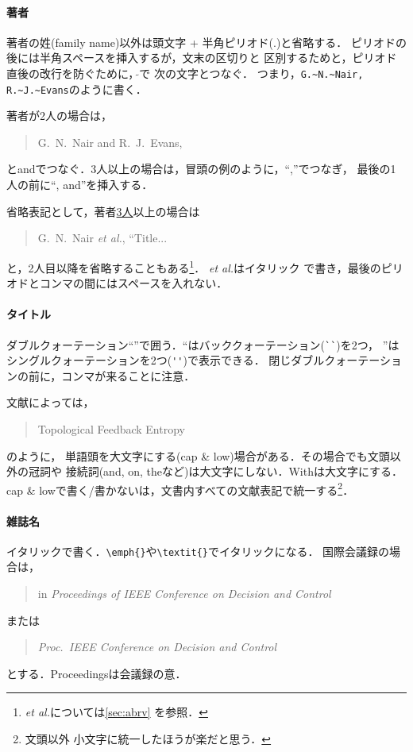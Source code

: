 \documentclass[a4paper,10pt,twocolumn,dvipdfmx]{jsarticle}
\theoremstyle{definition}
\begin{document}
\paragraph{著者}
著者の姓(family name)以外は頭文字 + 半角ピリオド(.)と省略する．
ピリオドの後には半角スペースを挿入するが，文末の区切りと
区別するためと，ピリオド直後の改行を防ぐために，$\tilde{}$で
次の文字とつなぐ．
つまり，\verb|G.~N.~Nair, R.~J.~Evans|のように書く．

著者が2人の場合は，
\begin{quote}
 G.~N.~Nair and R.~J.~Evans,
\end{quote}
とandでつなぐ．3人以上の場合は，冒頭の例のように，``,''でつなぎ，
最後の1人の前に``, and''を挿入する．

省略表記として，著者\underline{3人}以上の場合は
\begin{quote}
 G.~N.~Nair \emph{et al.}, ``Title...
\end{quote}
と，2人目以降を省略することもある\footnote{\emph{et al.}については\ref{sec:abrv}
を参照．}．
\emph{et al.}はイタリック
で書き，最後のピリオドとコンマの間にはスペースを入れない．

\paragraph{タイトル}
ダブルクォーテーション``''で囲う．``はバッククォーテーション(\verb|``|)を2つ，
''はシングルクォーテーションを2つ(\verb|''|)で表示できる．
閉じダブルクォーテーションの前に，コンマが来ることに注意．

文献によっては，
\begin{quote}
 Topological Feedback Entropy
\end{quote}
のように，
単語頭を大文字にする(cap \& low)場合がある．その場合でも文頭以外の冠詞や
接続詞(and, on, theなど)は大文字にしない．Withは大文字にする．
cap \& lowで書く/書かないは，文書内すべての文献表記で統一する\footnote{文頭以外
小文字に統一したほうが楽だと思う．}．

\paragraph{雑誌名}
イタリックで書く．\verb!\emph{}!や\verb!\textit{}!でイタリックになる．
国際会議録の場合は，
\begin{quote}
 in \emph{Proceedings of IEEE Conference on Decision and Control}
\end{quote}
または
\begin{quote}
 \emph{Proc.\ IEEE Conference on Decision and Control}
\end{quote}
とする．Proceedingsは会議録の意．
\end{document}
